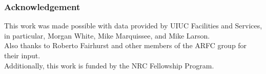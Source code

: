 \begin{frame}
  \frametitle{Acknowledgement}
  This work was made possible with data provided by UIUC Facilities and Services,
  in particular, Morgan White, Mike Marquissee, and Mike Larson. \\
  Also thanks to Roberto Fairhurst and other members of the ARFC group for their
  input.\\
  Additionally, this work is funded by the NRC Fellowship Program. \\
\end{frame}
